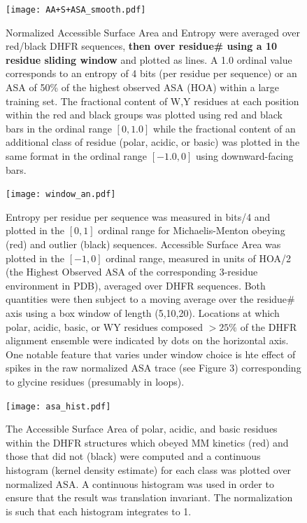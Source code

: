\documentclass[a4paper,11pt]{article}
\begin{document}
\begin{figure}[a]
\centerline{\texttt{[image: AA+S+ASA\_smooth.pdf]}}
\caption[Moving-Averages of $S_{\rm all}$, $ASA_{\rm all}$, WY/Polar/Acidic/Basic Content vs Residue \#]{Normalized Accessible Surface Area and Entropy were averaged over red/black DHFR sequences, \textbf{then over residue\# using a 10 residue sliding window} and plotted as lines. A 1.0 ordinal value corresponds to an entropy of 4 bits (per residue per sequence) or an ASA of 50\% of the highest observed ASA (HOA) within a large training set. The fractional content of W,Y residues at each position within the red and black groups was plotted using red and black bars in the ordinal range $[0,1.0]$ while the fractional content of an additional class of residue (polar, acidic, or basic) was plotted in the same format in the ordinal range $[-1.0,0]$ using downward-facing bars.}
\end{figure}


\begin{figure}
\centerline{\texttt{[image: window\_an.pdf]}}
\caption[Moving Averages of $S_{\rm red},S_{\rm black},ASA_{\rm red},ASA_{\rm 
black}$ for Windows of (5,10,20) Residues]{Entropy per residue per sequence was measured in bits/4 and plotted in the $[0,1]$ ordinal range for Michaelis-Menton obeying (red) and outlier (black) sequences. Accessible Surface Area was plotted in the $[-1,0]$ ordinal range, measured in units of HOA/2 (the Highest Observed ASA of the corresponding 3-residue environment in PDB), averaged over DHFR sequences. Both quantities were then subject to a moving average over the residue\# axis using a box window of length (5,10,20). Locations at which polar, acidic, basic, or WY residues composed $>25\%$ of the DHFR alignment ensemble were indicated by dots on the horizontal axis. One notable feature that varies under window choice is hte effect of spikes in the raw normalized ASA trace (see Figure 3) corresponding to glycine residues (presumably in loops).}
\end{figure}



\begin{figure}
\centerline{\texttt{[image: asa\_hist.pdf]}}
\caption[Histogram of (Polar,Acidic,Basic) ASA over MM, Outlier Groups]{The Accessible Surface Area of polar, acidic, and basic residues within the DHFR structures which obeyed MM kinetics (red) and those that did not (black) were computed and a continuous histogram (kernel density estimate) for each class was plotted over normalized ASA. A continuous histogram was used in order to ensure that the result was translation invariant. The normalization is such that each histogram integrates to 1.}
\end{figure}
\end{document}
